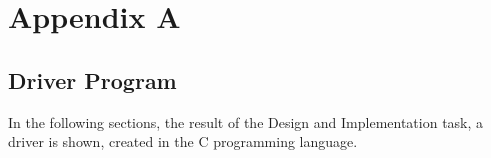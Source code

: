 \section{Appendix A}
\label{sec:appendix}

\subsection{Driver Program}

In the following sections, the result of the Design and Implementation task, a driver is shown, created in the C programming language.
